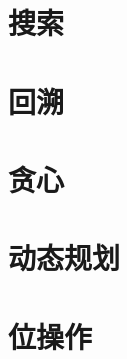 \documentclass[oneside]{book}
\begin{document}
\begin{CJK}{UTF8}{gbsn}
%

\chapter{搜索}


\chapter{回溯}


\chapter{贪心}


\chapter{动态规划}


\chapter{位操作}



\end{CJK}
\end{document}
